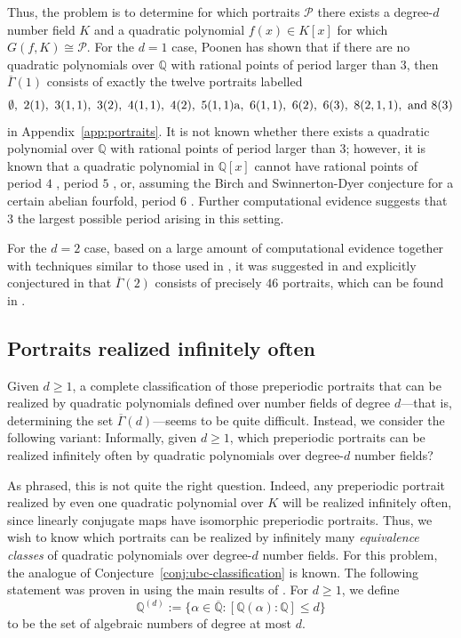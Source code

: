 \documentclass[12pt]{amsart}
\theoremstyle{definition}
\newcommand{\bbQ}{\mathbb{Q}}
\newcommand{\calP}{\mathcal{P}}
\newcommand{\QQbar}{\overline{\bbQ}}
\newcommand{\Gammabar}{\overline{\Gamma}}
\numberwithin{equation}{section}
\begin{document}
Thus, the problem is to determine for which portraits $\calP$ there exists a degree-$d$ number field $K$ and a quadratic polynomial $f(x) \in K[x]$ for which $G(f,K) \cong \calP$. 
For the $d = 1$ case, Poonen \cite{poonen:1998} has shown that if there are no quadratic polynomials over $\bbQ$ with rational points of period larger than $3$, then $\Gammabar(1)$ consists of exactly the twelve portraits labelled
    \[
    \rm
    \emptyset,\ 2(1),\ 3(1,1),\ 3(2),\ 4(1,1),\ 4(2),\ 5(1,1)a,\ 6(1,1),\ 6(2),\ 6(3),\ 8(2,1,1), \text{ and }  8(3)
    \]
in Appendix~\ref{app:portraits}. It is not known whether there exists a quadratic polynomial over $\bbQ$ with rational points of period larger than $3$; however, it is known that a quadratic polynomial in $\bbQ[x]$ cannot have rational points of period $4$ \cite{morton:1998}, period $5$ \cite{flynn/poonen/schaefer:1997}, or, assuming the Birch and Swinnerton-Dyer conjecture for a certain abelian fourfold, period $6$ \cite{stoll:2008}. Further computational evidence \cite{hutz/ingram:2013} suggests that $3$ the largest possible period arising in this setting.

For the $d = 2$ case, based on a large amount of computational evidence together with techniques similar to those used in \cite{poonen:1998}, it was suggested in \cite[p. 514]{doyle/faber/krumm:2014} and explicitly conjectured in \cite[Conjecture 1.4]{doyle:2018quad} that $\Gammabar(2)$ consists of precisely $46$ portraits, which can be found in \cite[Appendix B]{doyle/faber/krumm:2014}.

\subsection{Portraits realized infinitely often}

Given $d \ge 1$, a complete classification of those preperiodic portraits that can be realized by quadratic polynomials defined over number fields of degree $d$---that is, determining the set $\Gammabar(d)$---seems to be quite difficult. Instead, we consider the following variant: Informally, given $d \ge 1$, which preperiodic portraits can be realized infinitely often by quadratic polynomials over degree-$d$ number fields?

As phrased, this is not quite the right question. Indeed, any preperiodic portrait realized by even one quadratic polynomial over $K$ will be realized infinitely often, since linearly conjugate maps have isomorphic preperiodic portraits. Thus, we wish to know which portraits can be realized by infinitely many \emph{equivalence classes} of quadratic polynomials over degree-$d$ number fields.
For this problem, the analogue of Conjecture~\ref{conj:ubc-classification} is known. The following statement was proven in \cite{doyle/krumm:2024} using the main results of \cite{doyle/poonen:2020}. For $d \ge 1$, we define
    \[
    \bbQ^{(d)} := \{\alpha \in \QQbar : [\bbQ(\alpha) : \bbQ] \le d\}
    \]
to be the set of algebraic numbers of degree at most $d$. 
\end{document}
